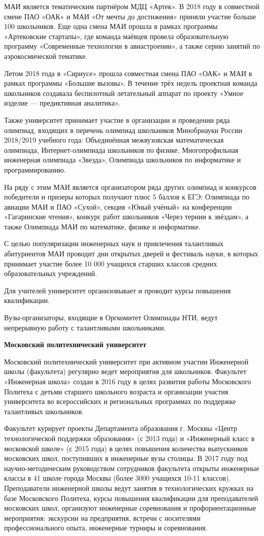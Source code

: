 МАИ является тематическим партнёром МДЦ «Артек». В 2018 году в совместной смене ПАО «ОАК» и МАИ «От мечты до достижения» приняли участие больше 100 школьников. Еще одна смена МАИ прошла в рамках программы «Артековские стартапы», где команда маёвцев провела образовательную программу «Современные технологии в авиастроении», а также серию занятий по аэрокосмической тематике.

Летом 2018 года в «Сириусе» прошла совместная смена ПАО «ОАК» и МАИ в рамках программы «Большие вызовы». В течение трёх недель проектная команда школьников создавала беспилотный летательный аппарат по проекту «Умное изделие — предиктивная аналитика».

Также университет принимает участие в организации и проведении ряда олимпиад, входящих в перечень олимпиад школьников Минобрнауки России 2018/2019 учебного года: Объединённая межвузовская математическая олимпиада, Интернет-олимпиада школьников по физике, Многопрофильная инженерная олимпиада «Звезда», Олимпиада школьников по информатике и программированию. 

На ряду с этим МАИ является организатором ряда других олимпиад и конкурсов победители и призеры которых получают плюс 5 баллов к ЕГЭ: Олимпиада по авиации МАИ и ПАО «Сухой», секция «Юный учёный» на конференции «Гагаринские чтения», конкурс работ школьников «Через тернии к звёздам», а также Олимпиада МАИ по математике, физике и информатике.

С целью популяризации инженерных наук и привлечения талантливых абитуриентов МАИ проводит дни открытых дверей и фестиваль науки, в которых принимает участие более 10 000 учащихся старших классов средних образовательных учреждений.

Для учителей университет организовывает и проводит курсы повышения квалификации.

Вузы-организаторы, входящие в Оргкомитет Олимпиады НТИ, ведут непрерывную работу с талантливыми школьниками.

\textbf{Московский политехнический университет}

Московский политехнический университет при активном участии Инженерной школы (факультета) регулярно ведет мероприятия для школьников. Факультет «Инженерная школа» создан в 2016 году в целях развития работы Московского Политеха с детьми старшего школьного возраста и организации участия университета во всероссийских и региональных программах по поддержке талантливых школьников.

Факультет курирует проекты Департамента образования г. Москвы «Центр технологической поддержки образования» (с 2013 года) и «Инженерный класс в московской школе» (с 2015 года) в целях повышения количества выпускников московских школ, поступивших в инженерные вузы столицы. В 2017 году под научно-методическим руководством сотрудников факультета открыты инженерные классы в 41 школе города Москвы (более 3000 учащихся 10-11 классов). Преподаватели инженерной школы ведут занятия в технологических кружках на базе Московского Политеха, курсы повышения квалификации для преподавателей московских школ, организуют инженерные соревнования и профориентационные мероприятия: экскурсии на предприятия, встречи с носителями профессионального опыта, инженерные турниры и соревнования.

